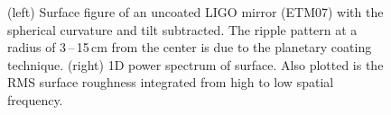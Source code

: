 \begin{figure}
    \centering
    \qquad
    \caption{(left) Surface figure of an uncoated LIGO mirror (ETM07) with the
      spherical curvature and tilt subtracted. The ripple pattern at a radius
      of 3\,--\,15\,cm from the center is due to the planetary coating technique.
      (right) 1D power spectrum of surface. Also
      plotted is the RMS surface roughness integrated from high to low
      spatial frequency.}
    \label{fig:PhaseMap}
\end{figure}


